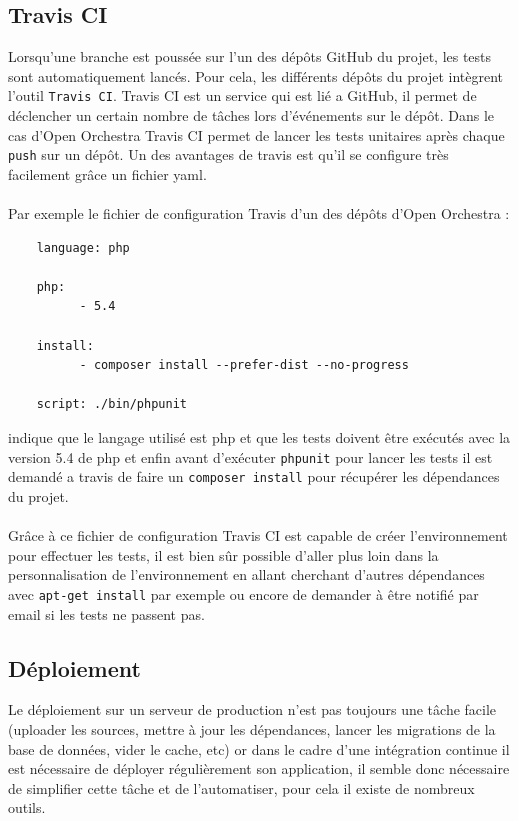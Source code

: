 \subsection{Travis CI}
Lorsqu'une branche est poussée sur l'un des dépôts GitHub du projet, les tests sont automatiquement lancés. Pour cela, les différents dépôts du projet intègrent l'outil \verb?Travis CI?. Travis CI est un service qui est lié a GitHub, il permet de déclencher un certain nombre de tâches lors d'événements sur le dépôt. Dans le cas d'Open Orchestra Travis CI permet de lancer les tests unitaires après chaque \verb?push? sur un dépôt. Un des avantages de travis est qu'il se configure très facilement grâce un fichier yaml.
\paragraph{}
Par exemple le fichier de configuration Travis d'un des dépôts d'Open Orchestra :
\begin{verbatim}
    language: php

    php:
          - 5.4

    install:
          - composer install --prefer-dist --no-progress
 
    script: ./bin/phpunit
\end{verbatim}

indique que le langage utilisé est php et que les tests doivent être exécutés avec la version 5.4 de php et enfin avant d'exécuter \verb?phpunit? pour lancer les tests il est demandé a travis de faire un \verb?composer install? pour récupérer les dépendances du projet.

\paragraph{}
 Grâce à ce fichier de configuration Travis CI est capable de créer l'environnement pour effectuer les tests, il est bien sûr possible d'aller plus loin dans la personnalisation de l'environnement en allant cherchant d'autres dépendances avec \verb?apt-get install? par exemple ou encore de demander à être notifié par email si les tests ne passent pas.

\subsection{Déploiement}
Le déploiement sur un serveur de production n'est pas toujours une tâche facile (uploader les sources, mettre à jour les dépendances, lancer les migrations de la base de données, vider le cache, etc)  or dans le cadre d'une intégration continue il est nécessaire de déployer régulièrement son application, il semble donc nécessaire de simplifier cette tâche et de l'automatiser, pour cela il existe de nombreux outils. 
